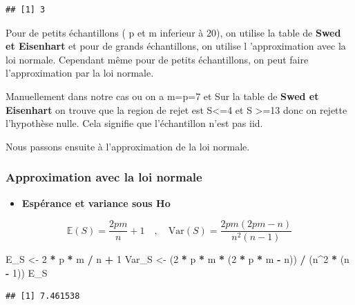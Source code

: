 \documentclass[
  12pt,
]{article}
\newenvironment{Shaded}{\begin{snugshade}}{\end{snugshade}}
\newcommand{\DecValTok}[1]{\textcolor[rgb]{0.00,0.00,0.81}{#1}}
\newcommand{\NormalTok}[1]{#1}
\newcommand{\OtherTok}[1]{\textcolor[rgb]{0.56,0.35,0.01}{#1}}
\newcommand{\SpecialCharTok}[1]{\textcolor[rgb]{0.81,0.36,0.00}{\textbf{#1}}}
\providecommand{\tightlist}{%
  \setlength{\itemsep}{0pt}\setlength{\parskip}{0pt}}
\begin{document}
\begin{verbatim}
## [1] 3
\end{verbatim}

Pour de petits échantillons ( p et m inferieur à 20), on utilise la
table de \textbf{Swed et Eisenhart} et pour de grands échantillons, on
utilise l 'approximation avec la loi normale. Cependant même pour de
petits échantillons, on peut faire l'approximation par la loi normale.

Manuellement dans notre cas ou on a m=p=7 et Sur la table de
\textbf{Swed et Eisenhart} on trouve que la region de rejet est
S\textless=4 et S \textgreater=13 donc on rejette l'hypothèse nulle.
Cela signifie que l'échantillon n'est pas iid.

Nous passons ensuite à l'approximation de la loi normale.

\subsubsection{Approximation avec la loi
normale}\label{approximation-avec-la-loi-normale}

\begin{itemize}
\tightlist
\item
  \textbf{Espérance et variance sous Ho}
\end{itemize}

\[
\mathbb{E}(S) = \frac{2pm}{n} + 1
\quad , \quad
\text{Var}(S) = \frac{2pm(2pm - n)}{n^2(n - 1)}
\]

\begin{Shaded}
\begin{Highlighting}[]
\NormalTok{E\_S }\OtherTok{\textless{}{-}} \DecValTok{2} \SpecialCharTok{*}\NormalTok{ p }\SpecialCharTok{*}\NormalTok{ m }\SpecialCharTok{/}\NormalTok{ n }\SpecialCharTok{+} \DecValTok{1}
\NormalTok{Var\_S }\OtherTok{\textless{}{-}}\NormalTok{ (}\DecValTok{2} \SpecialCharTok{*}\NormalTok{ p }\SpecialCharTok{*}\NormalTok{ m }\SpecialCharTok{*}\NormalTok{ (}\DecValTok{2} \SpecialCharTok{*}\NormalTok{ p }\SpecialCharTok{*}\NormalTok{ m }\SpecialCharTok{{-}}\NormalTok{ n)) }\SpecialCharTok{/}\NormalTok{ (n}\SpecialCharTok{\^{}}\DecValTok{2} \SpecialCharTok{*}\NormalTok{ (n }\SpecialCharTok{{-}} \DecValTok{1}\NormalTok{))}
\NormalTok{E\_S}
\end{Highlighting}
\end{Shaded}

\begin{verbatim}
## [1] 7.461538
\end{verbatim}
\end{document}
